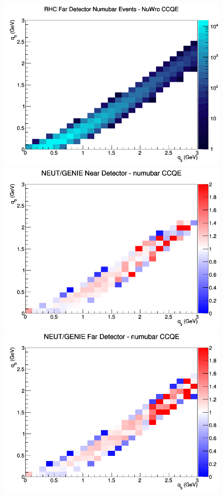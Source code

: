 \documentclass[12pt]{article}
\begin{document}
\begin{figure}[h]
\endminipage
{}
\includegraphics[width=\linewidth]{q0_q3/nominal/CCQE_RHC_FD_numubar_q3_q0_NuWro.png}
\endminipage
\newline
{}
\includegraphics[width=\linewidth]{q0_q3/nominal/ratios/CCQE_NEUT_GENIE_numubar_near_q3_q0.png}
\endminipage
{}
\includegraphics[width=\linewidth]{q0_q3/nominal/ratios/CCQE_NEUT_GENIE_numubar_far_q3_q0.png}

\end{figure}
\end{document}
